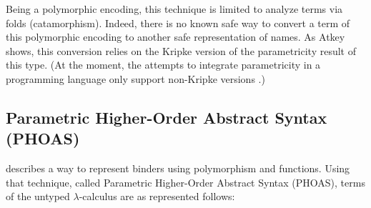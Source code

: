 \documentclass[9pt,preprint,authoryear]{sigplanconf}
\begin{document}
%
Being a polymorphic encoding, this technique is limited to analyze terms
    via folds (catamorphism). Indeed,
    there is no known safe way to convert a term of this polymorphic
    encoding to another safe representation of names. As Atkey
    shows, this conversion relies on the Kripke version of the
    parametricity result of this type. (At the moment, the attempts to
    integrate parametricity in a programming language only support 
    non-Kripke versions \cite{keller_parametricity_2012,bernardy_computational_2012,bernardy_type-theory_2013}.)%


\subsection{Parametric Higher-Order Abstract Syntax (PHOAS)}

%
\citet{chlipala_parametric_2008} describes a way to represent binders
    using polymorphism and functions. Using that technique, called
    Parametric Higher-Order Abstract Syntax (PHOAS), terms of the
    untyped $ \lambda $-calculus are as represented follows{:}%


{\nopagebreak }
\end{document}
